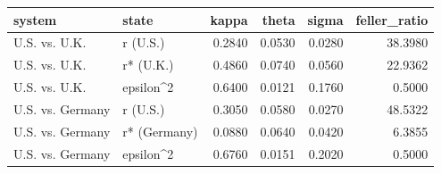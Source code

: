 \begin{tabular}{llrrrr}
\toprule
system & state & kappa & theta & sigma & feller_ratio \\
\midrule
U.S. vs. U.K. & r (U.S.) & 0.2840 & 0.0530 & 0.0280 & 38.3980 \\
U.S. vs. U.K. & r* (U.K.) & 0.4860 & 0.0740 & 0.0560 & 22.9362 \\
U.S. vs. U.K. & epsilon^2 & 0.6400 & 0.0121 & 0.1760 & 0.5000 \\
U.S. vs. Germany & r (U.S.) & 0.3050 & 0.0580 & 0.0270 & 48.5322 \\
U.S. vs. Germany & r* (Germany) & 0.0880 & 0.0640 & 0.0420 & 6.3855 \\
U.S. vs. Germany & epsilon^2 & 0.6760 & 0.0151 & 0.2020 & 0.5000 \\
\bottomrule
\end{tabular}
